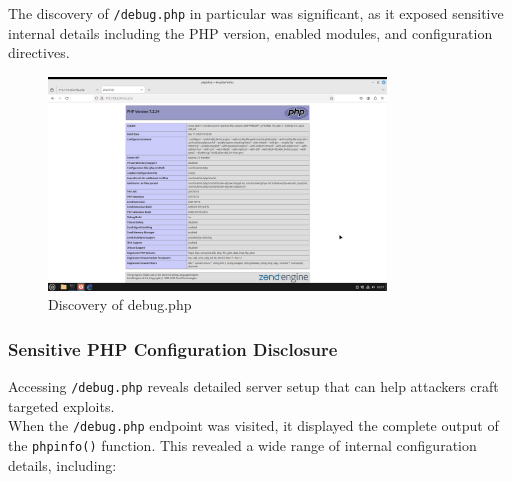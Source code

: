 \documentclass[12pt]{article}
\begin{document}
The discovery of \texttt{/debug.php} in particular was significant, as it exposed sensitive internal details including the PHP version, enabled modules, and configuration directives.

\begin{figure}[h!]
\centering
\includegraphics[width=0.8\textwidth]{PT7.png}
\caption{ Discovery of debug.php}
\label{fig:sql_injection}
\end{figure}

\FloatBarrier


\subsubsection{Sensitive PHP Configuration Disclosure}
Accessing \texttt{/debug.php} reveals detailed server setup that can help attackers craft targeted exploits.\\
When the \texttt{/debug.php} endpoint was visited, it displayed the complete output of the \texttt{phpinfo()} function. This revealed a wide range of internal configuration details, including:
\end{document}
